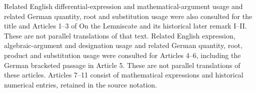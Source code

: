  Related English differential-expression and mathematical-argument usage and related German quantity, root and substitution usage were also consulted for the title and Articles 1–3 of On the Lemniscate and its historical later remark I–II. These are not parallel translations of that text.
 Related English expression, algebraic-argument and designation usage and related German quantity, root, product and substitution usage were consulted for Articles 4–6, including the German bracketed passage in Article 5. These are not parallel translations of these articles. Articles 7–11 consist of mathematical expressions and historical numerical entries, retained in the source notation.

\par\endgroup\clearpage\thispagestyle{empty}\begingroup\fontsize{9}{9.5}\selectfont\raggedright
{}\medskip

